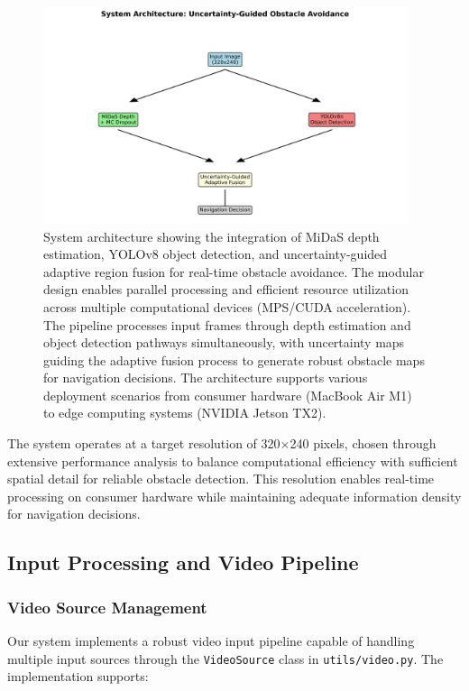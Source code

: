 \documentclass[12pt,oneside]{book}
\begin{document}
\begin{figure}[p]
\centering
\includegraphics[width=0.95\textwidth,height=0.85\textheight,keepaspectratio]{system_architecture.png}
\caption{System architecture showing the integration of MiDaS depth estimation, YOLOv8 object detection, and uncertainty-guided adaptive region fusion for real-time obstacle avoidance. The modular design enables parallel processing and efficient resource utilization across multiple computational devices (MPS/CUDA acceleration). The pipeline processes input frames through depth estimation and object detection pathways simultaneously, with uncertainty maps guiding the adaptive fusion process to generate robust obstacle maps for navigation decisions. The architecture supports various deployment scenarios from consumer hardware (MacBook Air M1) to edge computing systems (NVIDIA Jetson TX2).}
\label{fig:architecture}
\end{figure}

The system operates at a target resolution of 320$\times$240 pixels, chosen through extensive performance analysis to balance computational efficiency with sufficient spatial detail for reliable obstacle detection. This resolution enables real-time processing on consumer hardware while maintaining adequate information density for navigation decisions.

\subsection{Input Processing and Video Pipeline}

\subsubsection{Video Source Management}

Our system implements a robust video input pipeline capable of handling multiple input sources through the \texttt{VideoSource} class in \texttt{utils/video.py}. The implementation supports:
\end{document}
